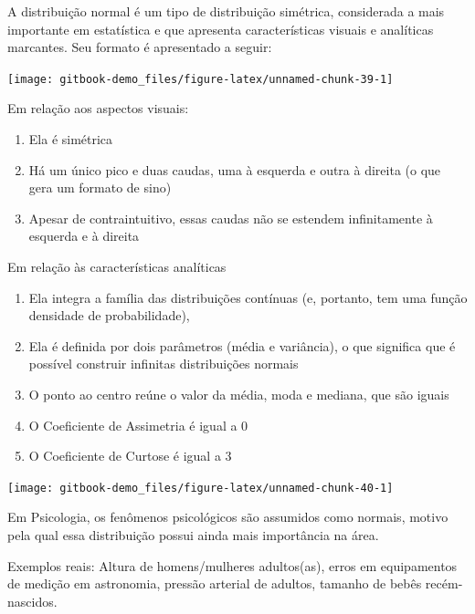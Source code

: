 \documentclass[
]{book}
\providecommand{\tightlist}{%
  \setlength{\itemsep}{0pt}\setlength{\parskip}{0pt}}
\begin{document}
A distribuição normal é um tipo de distribuição simétrica, considerada a
mais importante em estatística e que apresenta características visuais e
analíticas marcantes. Seu formato é apresentado a seguir:

\begin{center}\texttt{[image: gitbook-demo\_files/figure-latex/unnamed-chunk-39-1]} \end{center}

Em relação aos aspectos visuais:

\begin{enumerate}
\def\labelenumi{\arabic{enumi})}
\tightlist
\item
  Ela é simétrica
\item
  Há um único pico e duas caudas, uma à esquerda e outra à direita (o
  que gera um formato de sino)
\item
  Apesar de contraintuitivo, essas caudas não se estendem infinitamente
  à esquerda e à direita
\end{enumerate}

Em relação às características analíticas

\begin{enumerate}
\def\labelenumi{\arabic{enumi})}
\tightlist
\item
  Ela integra a família das distribuições contínuas (e, portanto, tem
  uma função densidade de probabilidade),
\item
  Ela é definida por dois parâmetros (média e variância), o que
  significa que é possível construir infinitas distribuições normais\\
\item
  O ponto ao centro reúne o valor da média, moda e mediana, que são
  iguais
\item
  O Coeficiente de Assimetria é igual a 0
\item
  O Coeficiente de Curtose é igual a 3
\end{enumerate}

\begin{center}\texttt{[image: gitbook-demo\_files/figure-latex/unnamed-chunk-40-1]} \end{center}

Em Psicologia, os fenômenos psicológicos são assumidos como normais,
motivo pela qual essa distribuição possui ainda mais importância na
área.

Exemplos reais: Altura de homens/mulheres adultos(as), erros em
equipamentos de medição em astronomia, pressão arterial de adultos,
tamanho de bebês recém-nascidos.
\end{document}
